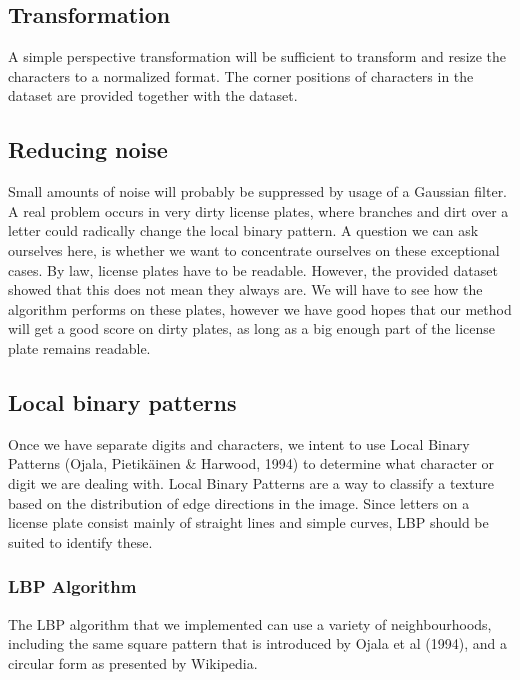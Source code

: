 \documentclass[a4paper]{article}
\begin{document}
\subsection{Transformation}

A simple perspective transformation will be sufficient to transform and resize
the characters to a normalized format. The corner positions of characters in
the dataset are provided together with the dataset.

\subsection{Reducing noise}

Small amounts of noise will probably be suppressed by usage of a Gaussian
filter. A real problem occurs in very dirty license plates, where branches and
dirt over a letter could radically change the local binary pattern. A question
we can ask ourselves here, is whether we want to concentrate ourselves on these
exceptional cases. By law, license plates have to be readable. However, the
provided dataset showed that this does not mean they always are. We will have
to see how the algorithm performs on these plates, however we have good hopes
that our method will get a good score on dirty plates, as long as a big enough
part of the license plate remains readable.

\subsection{Local binary patterns}
Once we have separate digits and characters, we intent to use Local Binary
Patterns (Ojala, Pietikäinen \& Harwood, 1994) to determine what character or
digit we are dealing with. Local Binary Patterns are a way to classify a
texture based on the distribution of edge directions in the image. Since
letters on a license plate consist mainly of straight lines and simple curves,
LBP should be suited to identify these.

\subsubsection{LBP Algorithm}
The LBP algorithm that we implemented can use a variety of neighbourhoods,
including the same square pattern that is introduced by Ojala et al (1994), and
a circular form as presented by Wikipedia.
\end{document}
